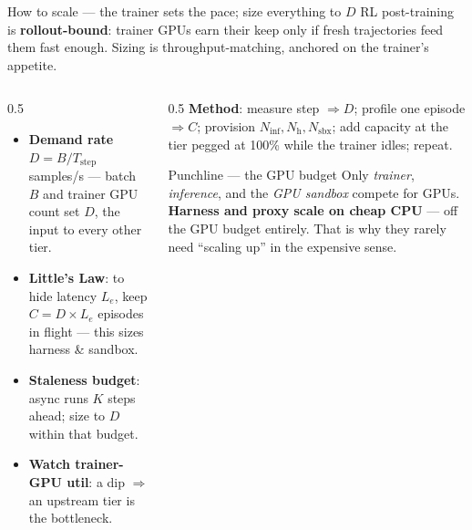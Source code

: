 \documentclass[aspectratio=169]{beamer}
\begin{document}
\begin{frame}{How to scale --- the trainer sets the pace; size everything to $D$}
  \footnotesize RL post-training is \textbf{rollout-bound}: trainer GPUs earn their keep only if fresh
  trajectories feed them fast enough. Sizing is throughput-matching, anchored on the trainer's appetite.
  \begin{columns}[T]
    \begin{column}{0.5\textwidth}
      \begin{itemize}\setlength\itemsep{0.15em}
        \item \textbf{Demand rate} $D = B / T_{\text{step}}$ samples/s --- batch $B$ and trainer GPU count
          set $D$, the input to every other tier.
        \item \textbf{Little's Law}: to hide latency $L_e$, keep $C = D\times L_e$ episodes in flight ---
          this sizes harness \& sandbox.
        \item \textbf{Staleness budget}: async runs $K$ steps ahead; size to $D$ within that budget.
        \item \textbf{Watch trainer-GPU util}: a dip $\Rightarrow$ an upstream tier is the bottleneck.
      \end{itemize}
    \end{column}
    \begin{column}{0.5\textwidth}
      \textbf{Method}: measure step $\Rightarrow D$; profile one episode $\Rightarrow C$; provision
      $N_{\text{inf}}, N_{\text{h}}, N_{\text{sbx}}$; add capacity at the tier pegged at 100\% while the
      trainer idles; repeat.
      \vspace{0.3em}
      \begin{block}{Punchline --- the GPU budget}
        \scriptsize Only \emph{trainer}, \emph{inference}, and the \emph{GPU sandbox} compete for
        GPUs. \textbf{Harness and proxy scale on cheap CPU} --- off the GPU budget entirely. That is why
        they rarely need ``scaling up'' in the expensive sense.
      \end{block}
    \end{column}
  \end{columns}
\end{frame}
\end{document}
